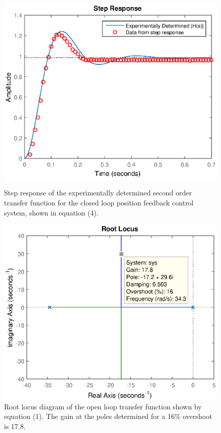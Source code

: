 \documentclass{article}
\begin{document}
\begin{figure}[H]
	\hspace{0.5cm}
	\begin{minipage}{7cm}
		\centering
		\includegraphics[scale=0.5]{fig8}
		\caption{Step response of the experimentally determined second order transfer function for the closed loop position feedback control system, shown in equation (4).}
	\end{minipage}
	\hspace{1cm}
	\begin{minipage}{7cm}
		\centering
		\includegraphics[scale=0.5]{fig9}
		\caption{Root locus diagram of the open loop transfer function shown by equation (1). The gain at the poles determined for a 16\% overshoot is 17.8.}
	\end{minipage}
\end{figure}
\end{document}
